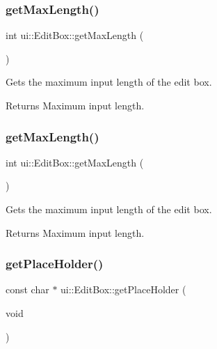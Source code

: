 \subsubsection{\texorpdfstring{get\+Max\+Length()}{getMaxLength()}\hspace{0.1cm}{\footnotesize\ttfamily [1/2]}}
{\footnotesize\ttfamily int ui\+::\+Edit\+Box\+::get\+Max\+Length (\begin{DoxyParamCaption}{ }\end{DoxyParamCaption})}

Gets the maximum input length of the edit box.

\begin{DoxyReturn}{Returns}
Maximum input length. 
\end{DoxyReturn}
\mbox{\label{classui_1_1EditBox_acd8e23e5b2db7c3b27a8e7cf9ce320c3}} 
\subsubsection{\texorpdfstring{get\+Max\+Length()}{getMaxLength()}\hspace{0.1cm}{\footnotesize\ttfamily [2/2]}}
{\footnotesize\ttfamily int ui\+::\+Edit\+Box\+::get\+Max\+Length (\begin{DoxyParamCaption}{ }\end{DoxyParamCaption})}

Gets the maximum input length of the edit box.

\begin{DoxyReturn}{Returns}
Maximum input length. 
\end{DoxyReturn}
\mbox{\label{classui_1_1EditBox_a47a20f50cb56438d96a87a60219fdce9}} 
\subsubsection{\texorpdfstring{get\+Place\+Holder()}{getPlaceHolder()}\hspace{0.1cm}{\footnotesize\ttfamily [1/2]}}
{\footnotesize\ttfamily const char $\ast$ ui\+::\+Edit\+Box\+::get\+Place\+Holder (\begin{DoxyParamCaption}\item[{void}]{ }\end{DoxyParamCaption})}

